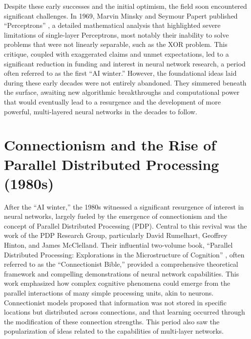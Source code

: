 Despite these early successes and the initial optimism, the field soon encountered significant challenges. In 1969, Marvin Minsky and Seymour Papert published ``Perceptrons'' \cite{minsky1969perceptrons}, a detailed mathematical analysis that highlighted severe limitations of single-layer Perceptrons, most notably their inability to solve problems that were not linearly separable, such as the XOR problem. This critique, coupled with exaggerated claims and unmet expectations, led to a significant reduction in funding and interest in neural network research, a period often referred to as the first ``AI winter.'' However, the foundational ideas laid during these early decades were not entirely abandoned. They simmered beneath the surface, awaiting new algorithmic breakthroughs and computational power that would eventually lead to a resurgence and the development of more powerful, multi-layered neural networks in the decades to follow.

\section{Connectionism and the Rise of Parallel Distributed Processing (1980s)}

After the ``AI winter,'' the 1980s witnessed a significant resurgence of interest in neural networks, largely fueled by the emergence of connectionism and the concept of Parallel Distributed Processing (PDP). Central to this revival was the work of the PDP Research Group, particularly David Rumelhart, Geoffrey Hinton, and James McClelland. Their influential two-volume book, ``Parallel Distributed Processing: Explorations in the Microstructure of Cognition'' \cite{mcclelland1986parallel}, often referred to as the ``Connectionist Bible,'' provided a comprehensive theoretical framework and compelling demonstrations of neural network capabilities. This work emphasized how complex cognitive phenomena could emerge from the parallel interactions of many simple processing units, akin to neurons. Connectionist models proposed that information was not stored in specific locations but distributed across connections, and that learning occurred through the modification of these connection strengths. This period also saw the popularization of ideas related to the capabilities of multi-layer networks.

